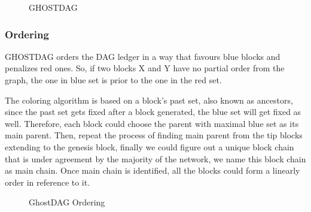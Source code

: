 \documentclass[a4paper,11pt]{article}
\begin{document}
\begin{figure}[ht]
	\centerline{%
	}
\caption{GHOSTDAG}
\end{figure}


\subsubsection{Ordering}

GHOSTDAG orders the DAG ledger in a way that favours blue blocks and penalizes
red ones. So, if two blocks X and Y have no partial order from the graph, the one in blue set is prior to the one in the red set.

The coloring algorithm is based on a block's past set, also known as ancestors, since the past set gets fixed after a block generated, the blue set will get fixed as well. Therefore, each block could choose the parent with maximal blue set as its main parent. Then, repeat the process of finding main parent from the tip blocks extending to the genesis block, finally we could figure out a unique block chain that is under agreement by the majority of the network, we name this block chain as main chain. Once main chain is identified, all the blocks could form a linearly order in reference to it. 


\begin{figure}[ht]
	\centerline{%
	}
\caption{GhostDAG Ordering}
\end{figure}
\end{document}
